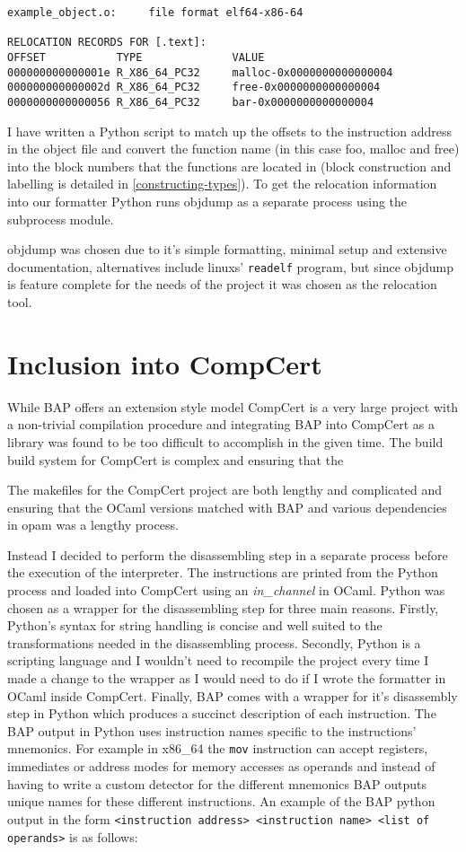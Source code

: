 \begin{lstlisting}
example_object.o:     file format elf64-x86-64

RELOCATION RECORDS FOR [.text]:
OFFSET           TYPE              VALUE 
000000000000001e R_X86_64_PC32     malloc-0x0000000000000004
000000000000002d R_X86_64_PC32     free-0x0000000000000004
0000000000000056 R_X86_64_PC32     bar-0x0000000000000004
\end{lstlisting}

I have written a Python script to match up the offsets to the instruction address in the object file and convert the function name (in this case foo, malloc and free) into the block numbers that the functions are located in (block construction and labelling is detailed in \ref{constructing-types}). To get the relocation information into our formatter Python runs objdump as a separate process using the subprocess module\cite{subprocess}.

objdump was chosen due to it's simple formatting, minimal setup and extensive documentation, alternatives include linuxs' \lstinline{readelf} program, but since objdump is feature complete for the needs of the project it was chosen as the relocation tool.

\section{Inclusion into CompCert}
While BAP offers an extension style model CompCert is a very large project with a non-trivial compilation procedure and integrating BAP into CompCert as a library was found to be too difficult to accomplish in the given time.  The build build system for CompCert is complex and ensuring that the 

The makefiles for the CompCert project are both lengthy and complicated and ensuring that the OCaml versions matched with BAP and various dependencies in opam was a lengthy process. 

Instead I decided to perform the disassembling step in a separate process before the execution of the interpreter. The instructions are printed from the Python process and loaded into CompCert using an \textit{in\_channel} in OCaml. Python was chosen as a wrapper for the disassembling step for three main reasons. Firstly, Python's syntax for string handling is concise and well suited to the transformations needed in the disassembling process. Secondly, Python is a scripting language and I wouldn't need to recompile the project every time I made a change to the wrapper as I would need to do if I wrote the formatter in OCaml inside CompCert. Finally, BAP comes with a wrapper for it's disassembly step in Python which produces a succinct description of each instruction. The BAP output in Python uses instruction names specific to the instructions' mnemonics. For example in x86\_64 the \lstinline{mov} instruction can accept registers, immediates or address modes for memory accesses as operands and instead of having to write a custom detector for the different mnemonics BAP outputs unique names for these different instructions. An example of the BAP python output in the form \lstinline{<instruction address> <instruction name> <list of operands>} is as follows:


